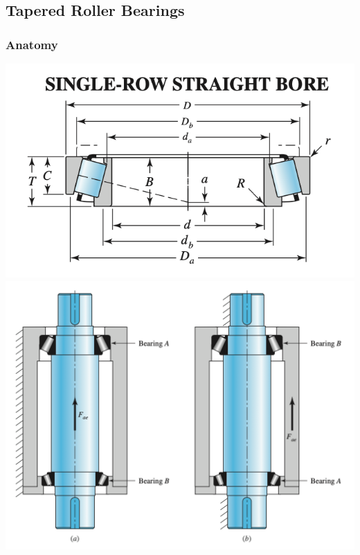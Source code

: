 \documentclass[11pt, fleqn]{article}
\begin{document}
\subsection{Tapered Roller Bearings}
\subsubsection{Anatomy}
\includegraphics[scale=0.7]{Bearings/tapered-geometry.png}
\includegraphics[scale=0.4]{Bearings/tapered-roller-bearings.png}
\end{document}
